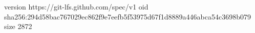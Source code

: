 version https://git-lfs.github.com/spec/v1
oid sha256:294d58bac767029ec862f9e7eefb5f53975d67f1d8889a446abca54c3698b079
size 2872
